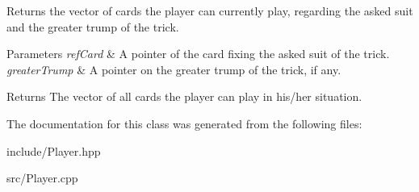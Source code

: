 \-Returns the vector of cards the player can currently play, regarding the asked suit and the greater trump of the trick. 


\begin{DoxyParams}{\-Parameters}
{\em ref\-Card} & \-A pointer of the card fixing the asked suit of the trick. \\
\hline
{\em greater\-Trump} & \-A pointer on the greater trump of the trick, if any. \\
\hline
\end{DoxyParams}
\begin{DoxyReturn}{\-Returns}
\-The vector of all cards the player can play in his/her situation. 
\end{DoxyReturn}


\-The documentation for this class was generated from the following files\-:\begin{DoxyCompactItemize}
\item 
include/\-Player.\-hpp\item 
src/\-Player.\-cpp\end{DoxyCompactItemize}
